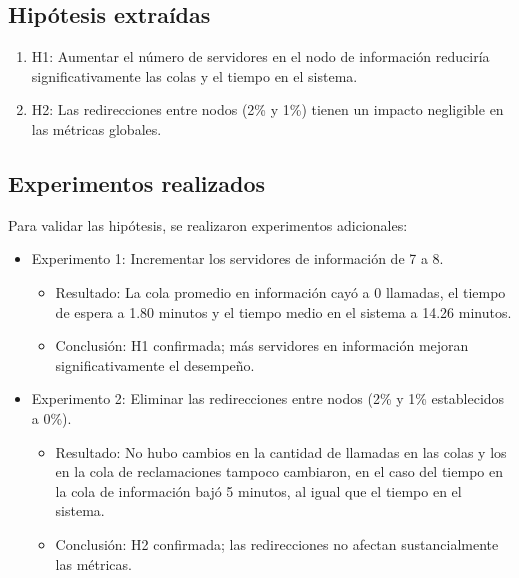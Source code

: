 \documentclass[12pt]{article}
\begin{document}
\subsection{Hipótesis extraídas}
\begin{enumerate}
    \item H1: Aumentar el número de servidores en el nodo de información reduciría significativamente las colas y el tiempo en el sistema.
    \item H2: Las redirecciones entre nodos (2\% y 1\%) tienen un impacto negligible en las métricas globales.
\end{enumerate}

\subsection{Experimentos realizados}
Para validar las hipótesis, se realizaron experimentos adicionales:
\begin{itemize}
    \item Experimento 1: Incrementar los servidores de información de 7 a 8.
    \begin{itemize}
        \item Resultado: La cola promedio en información cayó a 0 llamadas, el tiempo de espera a 1.80 minutos y el tiempo medio en el sistema a 14.26 minutos.
        \item Conclusión: H1 confirmada; más servidores en información mejoran significativamente el desempeño.
    \end{itemize}
    \item Experimento 2: Eliminar las redirecciones entre nodos (2\% y 1\% establecidos a 0\%).
    \begin{itemize}
        \item Resultado: No hubo cambios en la cantidad de llamadas en las colas y los en la cola de reclamaciones tampoco cambiaron, en el caso del tiempo en la cola de información bajó 5 minutos, al igual que el tiempo en el sistema.
        \item Conclusión: H2 confirmada; las redirecciones no afectan sustancialmente las métricas.
    \end{itemize}
\end{itemize}
\end{document}
